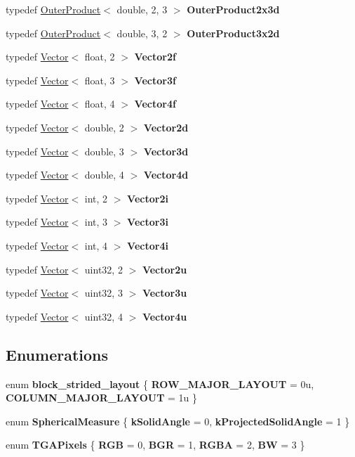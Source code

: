 \begin{DoxyCompactItemize}
\item 
typedef \hyperlink{structcugar_1_1_outer_product}{Outer\+Product}$<$ double, 2, 3 $>$ {\bfseries Outer\+Product2x3d}
\item 
typedef \hyperlink{structcugar_1_1_outer_product}{Outer\+Product}$<$ double, 3, 2 $>$ {\bfseries Outer\+Product3x2d}
\item 
typedef \hyperlink{structcugar_1_1_vector}{Vector}$<$ float, 2 $>$ {\bfseries Vector2f}
\item 
typedef \hyperlink{structcugar_1_1_vector}{Vector}$<$ float, 3 $>$ {\bfseries Vector3f}
\item 
typedef \hyperlink{structcugar_1_1_vector}{Vector}$<$ float, 4 $>$ {\bfseries Vector4f}
\item 
typedef \hyperlink{structcugar_1_1_vector}{Vector}$<$ double, 2 $>$ {\bfseries Vector2d}
\item 
typedef \hyperlink{structcugar_1_1_vector}{Vector}$<$ double, 3 $>$ {\bfseries Vector3d}
\item 
typedef \hyperlink{structcugar_1_1_vector}{Vector}$<$ double, 4 $>$ {\bfseries Vector4d}
\item 
typedef \hyperlink{structcugar_1_1_vector}{Vector}$<$ int, 2 $>$ {\bfseries Vector2i}
\item 
typedef \hyperlink{structcugar_1_1_vector}{Vector}$<$ int, 3 $>$ {\bfseries Vector3i}
\item 
typedef \hyperlink{structcugar_1_1_vector}{Vector}$<$ int, 4 $>$ {\bfseries Vector4i}
\item 
typedef \hyperlink{structcugar_1_1_vector}{Vector}$<$ uint32, 2 $>$ {\bfseries Vector2u}
\item 
typedef \hyperlink{structcugar_1_1_vector}{Vector}$<$ uint32, 3 $>$ {\bfseries Vector3u}
\item 
typedef \hyperlink{structcugar_1_1_vector}{Vector}$<$ uint32, 4 $>$ {\bfseries Vector4u}
\end{DoxyCompactItemize}
\subsection*{Enumerations}
\begin{DoxyCompactItemize}
\item 
\mbox{\label{group___iterators_ga3d26fe53e476a0d79cd2f2e23310ea32}} 
enum {\bfseries block\+\_\+strided\+\_\+layout} \{ {\bfseries R\+O\+W\+\_\+\+M\+A\+J\+O\+R\+\_\+\+L\+A\+Y\+O\+UT} = 0u, 
{\bfseries C\+O\+L\+U\+M\+N\+\_\+\+M\+A\+J\+O\+R\+\_\+\+L\+A\+Y\+O\+UT} = 1u
 \}
\item 
\mbox{\label{group___b_s_d_f_module_ga31d5c3496d9630777d98ec49f397cbfd}} 
enum {\bfseries Spherical\+Measure} \{ {\bfseries k\+Solid\+Angle} = 0, 
{\bfseries k\+Projected\+Solid\+Angle} = 1
 \}
\item 
\mbox{\label{namespacecugar_ad97d9aaf8758efbdbe97e8a1effcead5}} 
enum {\bfseries T\+G\+A\+Pixels} \{ {\bfseries R\+GB} = 0, 
{\bfseries B\+GR} = 1, 
{\bfseries R\+G\+BA} = 2, 
{\bfseries BW} = 3
 \}
\end{DoxyCompactItemize}
